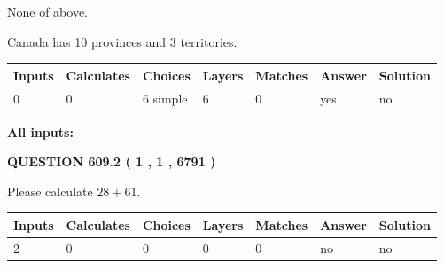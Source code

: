 \documentclass[12pt]{article}
\begin{document}
 
 None of above.
 
 
\noindent{}
 
 
Canada has 10  provinces and 3 territories.
 
 
\noindent{}
 
 
   
   
   
   
\noindent\begin{tabular}{|l|l|l|l|l|l|l|}
 \hline
Inputs & Calculates & Choices & Layers & Matches & Answer & Solution \\ \hline
 0  & 
 0  & 
 6
  simple  
  & 
 6  & 
 0  & 
  yes & 
  no 
  \\ \hline
 \end{tabular}
   
   
   
   
\noindent{}
   
   
   
   
\noindent\vspace{0.1in}\hspace{-0.08in} {\textbf{\Large{All inputs: }}}
   
   
  
\vspace{0.2in}
  
{\textbf{\Large{QUESTION
609.2 
 ( 1 , 1 , 6791 )
}}}
  
  
 
Please calculate $ %
28 +  %
61 $.
 
 
   
   
   
   
\noindent\begin{tabular}{|l|l|l|l|l|l|l|}
 \hline
Inputs & Calculates & Choices & Layers & Matches & Answer & Solution \\ \hline
 2  & 
 0  & 
 0
  & 
 0  & 
 0  & 
  no & 
  no 
  \\ \hline
 \end{tabular}
   
   
   
   
\noindent{}
   
\end{document}
